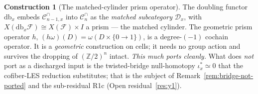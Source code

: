 \documentclass[11pt,oneside]{amsart}
\theoremstyle{plain}
\theoremstyle{definition}
\newtheorem{construction}[theorem]{Construction}
\theoremstyle{remark}
\theoremstyle{honeststyle}
\newcommand{\F}{\mathcal{F}}
\newcommand{\Z}{\mathbb{Z}}
\newcommand{\Cn}{\mathcal{C}^{\cap}_n}
\newcommand{\Cnm}{\mathcal{C}^{\cap}_{n-1,x}}
\newcommand{\Dx}{\mathcal{D}_x}
\begin{document}
\begin{construction}[The matched-cylinder prism operator]
\label{constr:bridge}
The doubling functor $\mathrm{db}_x$ embeds $\Cnm$ into $\Cn$ as the
\emph{matched subcategory} $\Dx$, with $X(\mathrm{db}_x\F)\cong
X(\F)\times I$ a prism --- the matched cylinder. The geometric prism
operator $h$, $(h\omega)(D)=\omega(D\times\{0\!\to\!1\})$, is a
degree-$(-1)$ cochain operator. It is a \emph{geometric} construction
on cells; it needs no group action and survives the dropping of
$(\Z/2)^n$ intact. \emph{This much ports cleanly.} What does
\emph{not} port as a discharged input is the twisted-bridge
null-homotopy $\iota_x^{*}\simeq0$ that the cofiber-LES reduction
substitutes; that is the subject of Remark~\ref{rem:bridge-not-ported}
and the sub-residual R1c (Open residual~\ref{res:y1}).
\end{construction}
\end{document}
